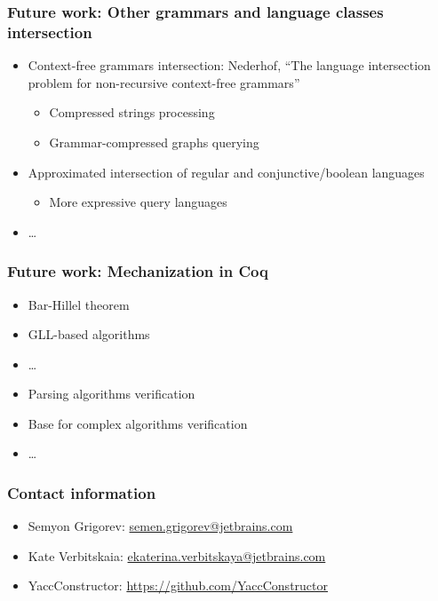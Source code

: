 \documentclass[xcolor=table]{beamer}
\begin{document}
\begin{frame}[fragile]
\transwipe[direction=90]
\frametitle{Future work: Other grammars and language classes intersection}
  \begin{itemize}
     \item Context-free grammars intersection: Nederhof, ``The language intersection problem for non-recursive context-free grammars''
     \begin{itemize}  
       \item Compressed strings processing
       \item Grammar-compressed graphs querying
     \end{itemize}
     \item Approximated intersection of regular and conjunctive/boolean languages
     \begin{itemize}  
       \item More expressive query languages
     \end{itemize}
     \item \dots
  \end{itemize}
\end{frame}

\begin{frame}[fragile]
\transwipe[direction=90]
\frametitle{Future work: Mechanization in Coq}
\begin{itemize}
     \item Bar-Hillel theorem
     \item GLL-based algorithms
     \item \dots
\end{itemize}
\begin{itemize}
     \item Parsing algorithms verification
     \item Base for complex algorithms verification
     \item \dots
\end{itemize}


\end{frame}

            
\begin{frame}
\transwipe[direction=90]
\frametitle{Contact information}
\begin{itemize}
  \item Semyon Grigorev: \href{mailto:semen.grigorev@jetbrains.com}{semen.grigorev@jetbrains.com}
  \item Kate Verbitskaia: \href{mailto:ekaterina.verbitskaya@jetbrains.com}{ekaterina.verbitskaya@jetbrains.com}
\end{itemize}
\begin{itemize}
  \item YaccConstructor: \href{https://github.com/YaccConstructor}{https://github.com/YaccConstructor}
\end{itemize}
\end{frame}
\end{document}
